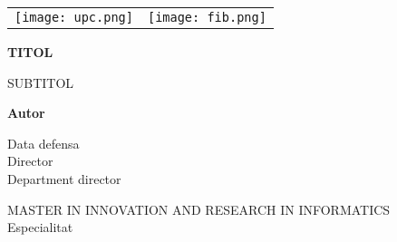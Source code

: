 \begin{titlepage}
  \tiny
  \vspace*{-3cm}
  \hspace*{-3cm}
  \begin{tabular}{lr}
    \texttt{[image: upc.png]} & \texttt{[image: fib.png]}  \\
  \end{tabular}
  \begin{center}
    \vspace{4cm}
    
    \Huge
    \textbf{TITOL}
    
    \vspace{0.5cm}
    \LARGE
    SUBTITOL
    
    \vspace{1.5cm}
    
    \textbf{Autor}
    
    \vfill
    
    \Large
    Data defensa\\
    Director\\
    Department director\\
    
    \vspace{1.5cm}

    \normalsize
    MASTER IN INNOVATION AND RESEARCH IN INFORMATICS\\
    Especialitat
  \end{center}
\end{titlepage}

